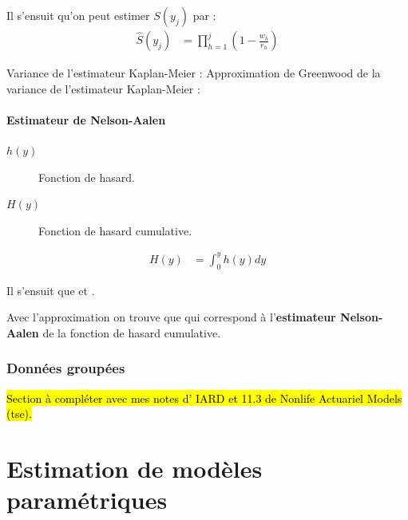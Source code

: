 \documentclass[french]{article}
\begin{document}
\begin{multicols*}{2}
Il s'ensuit qu'on peut estimer $S(y_{j})$ par :
\begin{align*}
	\hat{S}(y_{j})
	&=	\prod_{h = 1}^{j} \left(1 - \frac{w_{h}}{r_{h}}\right)
\end{align*}

Variance de l'estimateur Kaplan-Meier :  
Approximation de Greenwood de la variance de l'estimateur Kaplan-Meier :  


\paragraph{Estimateur de Nelson-Aalen}
\begin{distributions}[Notation]
\begin{description}
	\item[$h(y)$]	Fonction de hasard.
	\item[$H(y)$]	Fonction de hasard cumulative.
\end{description}
\end{distributions} 

\begin{align*}
	H(y)
	&=	\int_{0}^{y} h(y) dy
\end{align*}

Il s'ensuit que  et .

Avec l'approximation  on trouve que  qui correspond à l'\textbf{estimateur Nelson-Aalen} de la fonction de hasard cumulative.



\columnbreak
\subsubsection{Données groupées}
\hl{Section à compléter avec mes notes d’ IARD et 11.3 de Nonlife Actuariel Models (tse).}




\newpage
\section{Estimation de modèles paramétriques}\label{sec:paramModelEstimLikelihood}

\end{multicols*}
\end{document}
